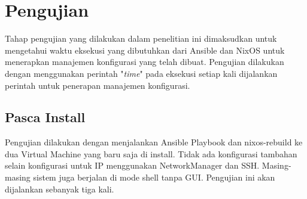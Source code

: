\documentclass[10pt,]{report}
\begin{document}
\section{Pengujian}
\begin{adjustwidth}{20pt}{}
	\hspace\parindent
	Tahap pengujian yang dilakukan dalam penelitian ini dimaksudkan untuk mengetahui
	waktu eksekusi yang dibutuhkan dari Ansible dan NixOS untuk menerapkan manajemen
	konfigurasi yang telah dibuat. Pengujian dilakukan dengan menggunakan perintah
	"\textit{time}" pada eksekusi setiap kali dijalankan perintah untuk penerapan manajemen
	konfigurasi.
	\subsection{Pasca Install}
	\begin{adjustwidth}{20pt}{}
		Pengujian dilakukan dengan menjalankan Ansible Playbook dan nixos-rebuild
		ke dua Virtual Machine yang baru saja di install. Tidak ada konfigurasi
		tambahan selain konfigurasi untuk IP menggunakan NetworkManager dan SSH.
		Masing-masing sistem juga berjalan di mode shell tanpa GUI. Pengujian ini
		akan dijalankan sebanyak tiga kali.
	\end{adjustwidth}


\end{adjustwidth}
\end{document}

